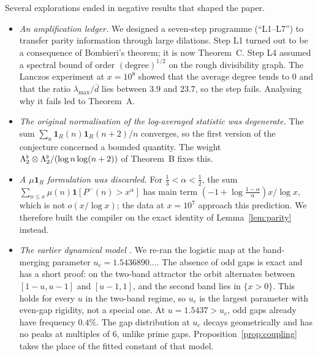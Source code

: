 Several explorations ended in negative results that shaped the paper.
\begin{itemize}
\item \emph{An amplification ledger.} We designed a seven-step programme (``L1--L7'') to transfer parity information through large dilations. Step L1 turned out to be a consequence of Bombieri's theorem; it is now Theorem~C. Step L4 assumed a spectral bound of order $(\text{degree})^{1/2}$ on the rough divisibility graph. The Lanczos experiment at $x=10^8$ showed that the average degree tends to $0$ and that the ratio $\lambda_{\max}/\bar d$ lies between $3.9$ and $23.7$, so the step fails. Analysing why it fails led to Theorem~A.
\item \emph{The original normalisation of the log-averaged statistic was degenerate.} The sum $\sum_n\mathbf 1_R(n)\mathbf 1_R(n+2)/n$ converges, so the first version of the conjecture concerned a bounded quantity. The weight $\Lambda_2^{\flat}\otimes\Lambda_2^{\flat}/(\log n\log(n+2))$ of Theorem~B fixes this.
\item \emph{A $\mu\mathbf 1_R$ formulation was discarded.} For $\frac13<\alpha<\frac12$, the sum $\sum_{n\le x}\mu(n)\mathbf 1[P^-(n)>x^\alpha]$ has main term $(-1+\log\frac{1-\alpha}\alpha)x/\log x$, which is not $o(x/\log x)$; the data at $x=10^7$ approach this prediction. We therefore built the compiler on the exact identity of Lemma~\ref{lem:parity} instead.
\item \emph{The earlier dynamical model \cite{Wan26}.} We re-ran the logistic map at the band-merging parameter $u_c=1.5436890\ldots$. The absence of odd gaps is exact and has a short proof: on the two-band attractor the orbit alternates between $[1-u,u-1]$ and $[u-1,1]$, and the second band lies in $\{x>0\}$. This holds for every $u$ in the two-band regime, so $u_c$ is the largest parameter with even-gap rigidity, not a special one. At $u=1.5437>u_c$, odd gaps already have frequency $0.4\%$. The gap distribution at $u_c$ decays geometrically and has no peaks at multiples of $6$, unlike prime gaps. Proposition~\ref{prop:coupling} takes the place of the fitted constant of that model.
\end{itemize}

